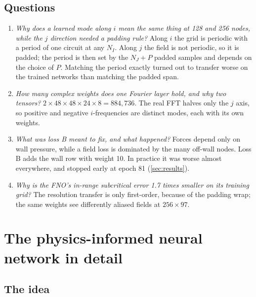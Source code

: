 \subsection*{Questions}
\begin{enumerate}[label=Q\arabic*., leftmargin=*]
\item \textit{Why does a learned mode along $i$ mean the same thing at 128 and 256 nodes, while the $j$
direction needed a padding rule?}\newline
Along $i$ the grid is periodic with a period of one circuit at any $N_I$. Along $j$ the field is
not periodic, so it is padded; the period is then set by the $N_J + P$ padded samples and depends
on the choice of $P$. Matching the period exactly turned out to transfer worse on the trained
networks than matching the padded span.
\item \textit{How many complex weights does one Fourier layer hold, and why two tensors?}\newline
$2\times48\times48\times24\times8 = 884{,}736$. The real FFT halves only the $j$ axis, so positive
and negative $i$-frequencies are distinct modes, each with its own weights.
\item \textit{What was loss B meant to fix, and what happened?}\newline
Forces depend only on wall pressure, while a field loss is dominated by the many off-wall nodes.
Loss B adds the wall row with weight 10. In practice it was worse almost everywhere, and stopped
early at epoch 81 (\cref{sec:results}).
\item \textit{Why is the FNO's in-range subcritical error 1.7 times smaller on its training grid?}\newline
The resolution transfer is only first-order, because of the padding wrap; the same weights see
differently aliased fields at $256\times97$.
\end{enumerate}

\section{The physics-informed neural network in detail}
\label{app:pinn}

\subsection{The idea}

